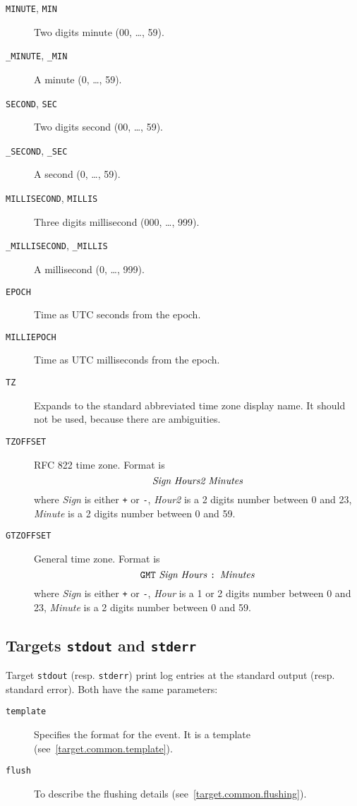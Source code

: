 \begin{description}
  \item[{\tt MINUTE}, {\tt MIN}]
    Two digits minute (00, \dots, 59).
  \item[{\tt \_MINUTE}, {\tt \_MIN}]
    A minute (0, \dots, 59).
    
  \item[{\tt SECOND}, {\tt SEC}]
    Two digits second (00, \dots, 59).
  \item[{\tt \_SECOND}, {\tt \_SEC}]
    A second (0, \dots, 59).
  
  \item[{\tt MILLISECOND}, {\tt MILLIS}]
    Three digits millisecond (000, \dots, 999).
  \item[{\tt \_MILLISECOND}, {\tt \_MILLIS}]
    A millisecond (0, \dots, 999).
  
  \item[{\tt EPOCH}]
    Time as UTC seconds from the epoch.
  \item[{\tt MILLIEPOCH}]
    Time as UTC milliseconds from the epoch.
  
  \item[{\tt TZ}]
    Expands to the standard abbreviated time zone display name.
    It should not be used, because there are ambiguities.
  \item[{\tt TZOFFSET}]
    RFC 822 time zone.
    Format is
      $$\mbox{{\it Sign} {\it Hours2} {\it Minutes}}$$
    where 
      {\it Sign} is either \verb|+| or \verb|-|,
      {\it Hour2} is a 2 digits number between 0 and 23,
      {\it Minute} is a 2 digits number between 0 and 59.
  \item[{\tt GTZOFFSET}]
    General time zone.
    Format is 
      $$\mbox{{\tt GMT} {\it Sign} {\it Hours} {\tt:} {\it Minutes}}$$
    where
      {\it Sign} is either \verb|+| or \verb|-|,
      {\it Hour} is a 1 or 2 digits number between 0 and 23,
      {\it Minute} is a 2 digits number between 0 and 59.
\end{description}


\subsection{Targets {\tt stdout} and {\tt stderr}}
Target {\tt stdout} (resp. {\tt stderr}) print log entries at the standard
output (resp. standard error).
Both have the same parameters:
%
\begin{description}
  \item[{\tt template}]
    Specifies the format for the event.
    It is a template (see~\ref{target.common.template}).
    
  \item[{\tt flush}]
    To describe the flushing details (see~\ref{target.common.flushing}).
\end{description}
%


